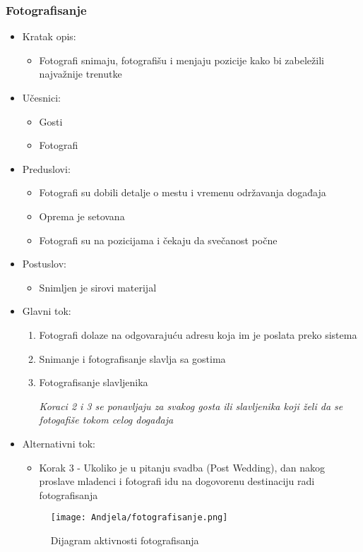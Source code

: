 \documentclass[a4paper]{article}
\begin{document}
\subsubsection{Fotografisanje}
\begin{itemize}
    \item Kratak opis: 
    \begin{itemize}
        \item Fotografi snimaju, fotografišu i menjaju pozicije kako bi zabeležili najvažnije trenutke
    \end{itemize}
    \item Učesnici:
        \begin{itemize}
        \item Gosti
        \item Fotografi
    \end{itemize}
    \item Preduslovi:
        \begin{itemize}
            \item Fotografi su dobili detalje o mestu i vremenu održavanja događaja
            \item Oprema je setovana
            \item Fotografi su na pozicijama i čekaju da svečanost počne
        \end{itemize}
    \item Postuslov:
        \begin{itemize}
            \item Snimljen je sirovi materijal
            \end{itemize}
    \item Glavni tok:
        \begin{enumerate}
            \item Fotografi dolaze na odgovarajuću adresu koja im je poslata preko sistema
            \item Snimanje i fotografisanje slavlja sa gostima
            \item Fotografisanje slavljenika
            
            \textit{Koraci 2 i 3 se ponavljaju za svakog gosta ili slavljenika koji želi da se fotogafiše tokom celog događaja}
        \end{enumerate}
    \item Alternativni tok:
        \begin{itemize}
            \item Korak 3 - Ukoliko je u pitanju svadba (Post Wedding), dan nakog proslave mladenci i fotografi idu na dogovorenu destinaciju radi fotografisanja
    \end{itemize}
    
    \begin{figure}[H]
    \centering
\texttt{[image: Andjela/fotografisanje.png]}
    \caption{Dijagram aktivnosti fotografisanja}
    \label{fig:RegistracijaZ}
\end{figure}
    
        
\end{itemize}
\end{document}
